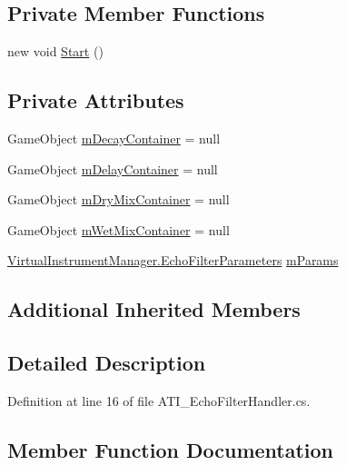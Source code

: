 \subsection*{Private Member Functions}
\begin{DoxyCompactItemize}
\item 
new void \hyperlink{class_a_t_i___echo_filter_handler_a81ac0206d565c1c120dbe9e122474e8e}{Start} ()
\end{DoxyCompactItemize}
\subsection*{Private Attributes}
\begin{DoxyCompactItemize}
\item 
Game\+Object \hyperlink{class_a_t_i___echo_filter_handler_a4e5a10c78852a38c5a6065efdf3f04f8}{m\+Decay\+Container} = null
\item 
Game\+Object \hyperlink{class_a_t_i___echo_filter_handler_a5f454ea9d1603937c5ddb4e3e1f7317d}{m\+Delay\+Container} = null
\item 
Game\+Object \hyperlink{class_a_t_i___echo_filter_handler_a631c4608453cd55ca976926e6e8e8ff2}{m\+Dry\+Mix\+Container} = null
\item 
Game\+Object \hyperlink{class_a_t_i___echo_filter_handler_a571d860b69c4ca4105355d0f1447feb2}{m\+Wet\+Mix\+Container} = null
\item 
\hyperlink{group__filter_params_struct_virtual_instrument_manager_1_1_echo_filter_parameters}{Virtual\+Instrument\+Manager.\+Echo\+Filter\+Parameters} \hyperlink{class_a_t_i___echo_filter_handler_afe435170679cf364951083e6f6ffab36}{m\+Params}
\end{DoxyCompactItemize}
\subsection*{Additional Inherited Members}


\subsection{Detailed Description}


Definition at line 16 of file A\+T\+I\+\_\+\+Echo\+Filter\+Handler.\+cs.



\subsection{Member Function Documentation}
\mbox{\label{class_a_t_i___echo_filter_handler_a280746246e42f85d36f96640a7148705}} 
